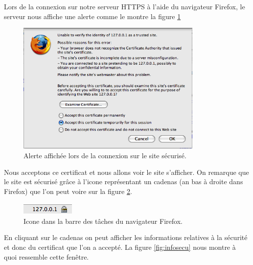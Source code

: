 \documentclass[10pt,a4paper,titlepage]{article}
\begin{document}
Lors de la connexion sur notre serveur HTTPS à l'aide du navigateur Firefox, le serveur nous affiche une alerte comme le montre la figure \ref{fig:connex}

\begin{figure}[htbp]
   \begin{center}
      \includegraphics[width=345px]{img/1.png}
   \end{center}
   \caption{Alerte affichée lors de la connexion sur le site sécurisé.}
	\label{fig:connex}
\end{figure}

Nous acceptons ce certificat et nous allons voir le site s'afficher. On remarque que le site est sécurisé grâce à l'icone représentant un cadenas (an bas à droite dans Firefox) que l'on peut voire sur la figure \ref{fig:icone}.

\begin{figure}[htbp]
   \begin{center}
      \includegraphics[height=23px]{img/2.png}
   \end{center}
   \caption{Icone dans la barre des tâches du navigateur Firefox.}
	\label{fig:icone}
\end{figure}

En cliquant sur le cadenas on peut afficher les informations relatives à la sécurité et donc du certificat que l'on a accepté. La figure \ref{fig:infosecu} nous montre à quoi ressemble cette fenêtre.
\end{document}
